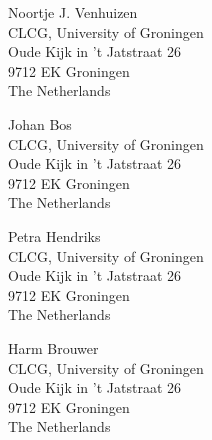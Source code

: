 \documentclass{salt}
\begin{document}

\newpage %



\begin{addresses}
  \begin{address}
    Noortje J. Venhuizen \\
    CLCG, University of Groningen\\
    Oude Kijk in 't Jatstraat 26\\
    9712 EK Groningen\\
    The Netherlands \\
  \end{address}
  \begin{address}
    Johan Bos \\
    CLCG, University of Groningen\\
    Oude Kijk in 't Jatstraat 26\\
    9712 EK Groningen\\
    The Netherlands \\
  \end{address}
  \begin{address}
    Petra Hendriks \\
    CLCG, University of Groningen\\
    Oude Kijk in 't Jatstraat 26\\
    9712 EK Groningen\\
    The Netherlands \\
  \end{address}
  \begin{address}
    Harm Brouwer \\
    CLCG, University of Groningen\\
    Oude Kijk in 't Jatstraat 26\\
    9712 EK Groningen\\
    The Netherlands \\
  \end{address}
\end{addresses}


\clearpage
\end{document}
